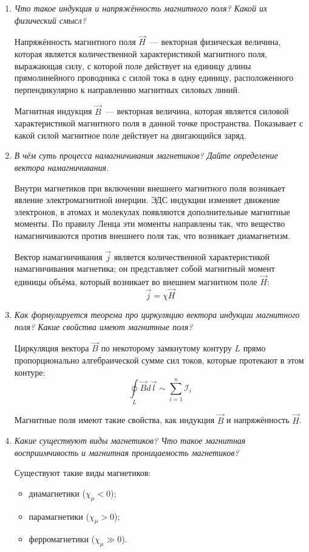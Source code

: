 \documentclass[paper=a4,pagesize,draft,10pt]{scrartcl}
\begin{document}
\begin{enumerate}
\item \textit{Что такое индукция и напряжённость магнитного поля? Какой их физический смысл?}

Напряжённость магнитного поля $\vec{H}$~--- векторная физическая величина, которая является количественной характеристикой магнитного поля, выражающая силу, с которой поле действует на единицу длины прямолинейного проводника с силой тока в одну единицу, расположенного перпендикулярно к направлению магнитных силовых линий.

Магнитная индукция $\vec{B}$~--- векторная величина, которая является силовой характеристикой магнитного поля в данной точке пространства. Показывает с какой силой магнитное поле действует на двигающийся заряд.
\item \textit{В чём суть процесса намагничивания магнетиков? Дайте определение вектора намагничивания.}

Внутри магнетиков при включении внешнего магнитного поля возникает явление электромагнитной инерции.
ЭДС индукции изменяет движение электронов, в атомах и молекулах появляются дополнительные магнитные моменты.
По правилу Ленца эти моменты направлены так, что вещество намагничиваются против внешнего поля так, что возникает диамагнетизм.

Вектор намагничивания $\vec{j}$ является количественной характеристикой намагничивания магнетика; он представляет собой магнитный момент единицы объёма, который возникает во внешнем магнитном поле $\vec{H}$:
$$\vec{j}=\chi\vec{H}$$
\item \textit{Как формулируется теорема про циркуляцию вектора индукции магнитного поля? Какие свойства имеют магнитные поля?}

Циркуляция вектора $\vec{B}$ по некоторому замкнутому контуру $L$ прямо пропорционально алгебраической сумме сил токов, которые протекают в этом контуре:
$$\oint\limits_L \vec{B}d\vec{l} \sim \sum\limits^n_{i=1}\mathcal{I}_i$$

Магнитные поля имеют такие свойства, как индукция $\vec{B}$ и напряжённость $\vec{H}$.
\item \textit{Какие существуют виды магнетиков? Что такое магнитная восприимчивость и магнитная проницаемость магнетиков?}

Существуют такие виды магнетиков:
\begin{itemize}
\item диамагнетики ($\chi_\mu<0$);
\item парамагнетики ($\chi_\mu>0$);
\item ферромагнетики ($\chi_\mu\gg0$).
\end{itemize}


\end{enumerate}
\end{document}
